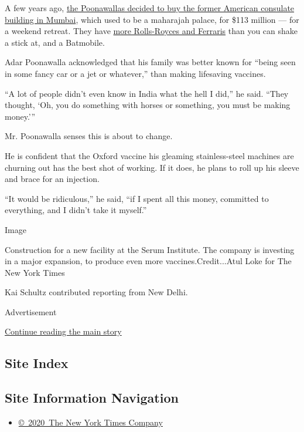 A few years ago,
\href{https://www.cnbc.com/2015/09/14/cyrus-poonawalla-buys-mumbais-lincoln-house-setting-india-record.html}{the
Poonawallas decided to buy the former American consulate building in
Mumbai}, which used to be a maharajah palace, for \$113 million --- for
a weekend retreat. They have
\href{https://www.youtube.com/watch?v=Da0-uMocTMc}{more Rolls-Royces and
Ferraris} than you can shake a stick at, and a Batmobile.

Adar Poonawalla acknowledged that his family was better known for
``being seen in some fancy car or a jet or whatever,'' than making
lifesaving vaccines.

``A lot of people didn't even know in India what the hell I did,'' he
said. ``They thought, `Oh, you do something with horses or something,
you must be making money.'''

Mr. Poonawalla senses this is about to change.

He is confident that the Oxford vaccine his gleaming stainless-steel
machines are churning out has the best shot of working. If it does, he
plans to roll up his sleeve and brace for an injection.

``It would be ridiculous,'' he said, ``if I spent all this money,
committed to everything, and I didn't take it myself.''

Image

Construction for a new facility at the Serum Institute. The company is
investing in a major expansion, to produce even more
vaccines.Credit...Atul Loke for The New York Times

Kai Schultz contributed reporting from New Delhi.

Advertisement

\protect\hyperlink{after-bottom}{Continue reading the main story}

\hypertarget{site-index}{%
\subsection{Site Index}\label{site-index}}

\hypertarget{site-information-navigation}{%
\subsection{Site Information
Navigation}\label{site-information-navigation}}

\begin{itemize}
\tightlist
\item
  \href{https://help.nytimes3xbfgragh.onion/hc/en-us/articles/115014792127-Copyright-notice}{©~2020~The
  New York Times Company}
\end{itemize}

